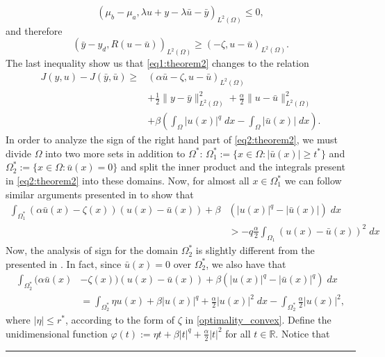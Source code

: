 \documentclass[11pt,a4paper]{amsart}
\newcommand{\kw}{\rule{2mm}{2mm}}
\newcommand{\om}{\Omega}
\renewenvironment{proof}{{Proof.}}{\hfill\kw}
\newcommand{\norm}[1]{\lVert #1 \rVert}
\begin{document}
\begin{proof}
  \[
  (\mu_b-\mu_a,\lambda u+y-\lambda \bar{u}-\bar{y})_{L^2(\om)}\le 0,
  \]
  and therefore
  \[
  (\bar{y}-y_d, R(u-\bar{u}))_{L^2(\Omega)}\ge (-\zeta,u-\bar{u})_{L^2(\om)}.
  \]
  The last inequality show us that \eqref{eq1:theorem2} changes to the relation
  \begin{equation}\label{eq2:theorem2}
     \begin{split}
        J(y,u)-J(\bar{y},\bar{u})\ge&(\alpha\bar{u}-\zeta,u-\bar{u})_{L^2(\Omega)}\\
        &+\frac{1}{2}\norm{y-\bar{y}}_{L^2(\om)}^2+\frac{\alpha}{2}\norm{u-\bar{u}}_{L^2(\om)}^2\\
        &+\beta\left(\int_{\Omega}|u(x)|^q\; dx-\int_{\om}|\bar{u}(x)|\; dx\right).
        \end{split}
    \end{equation}
In order to analyze the sign of the right hand part of \eqref{eq2:theorem2}, we must divide $\om$ into two more sets in addition to $\om^*$: $\om_1^*:=\{x\in \om:|\bar{u}(x)|\ge t^*\}$ and $\om^*_2:=\{x\in\om:\bar{u}(x)=0\}$ and split the inner product and the integrals present in \eqref{eq2:theorem2} into these domains. Now, for almost all $x\in \om_1^*$ we can follow similar arguments presented in \cite{merino-nejer} to show that
\begin{equation}\label{eq3:theorem2}
\begin{split}   
\int_{\om_1^*}(\alpha\bar{u}(x)-\zeta(x))(u(x)-\bar{u}(x))+\beta&\left(|u(x)|^q-|\bar{u}(x)|\right)\; dx\\
&>-q\frac{\alpha}{2}\int_{\om_1}(u(x)-\bar{u}(x))^2\; dx
    \end{split}
\end{equation}
Now, the analysis of sign for the domain $\om_2^*$ is slightly different from the presented in \cite{merino-nejer}. In fact, since $\bar{u}(x)=0$ over $\om_{2}^*$, we also have that
\begin{equation}\label{eq4:theorem2}
\begin{split}   
\int_{\om_2^*}(\alpha\bar{u}(x)&-\zeta(x))(u(x)-\bar{u}(x))+\beta\left(|u(x)|^q-|\bar{u}(x)|^q\right)\; dx\\
&=\int_{\om_2^*}\eta u(x)+\beta |u(x)|^q+\frac{\alpha}{2}|u(x)|^2\; dx-\int_{\om_2^*}\frac{\alpha}{2}|u(x)|^2,
    \end{split}
\end{equation}
where $|\eta|\le r^*$, according to the form of $\zeta$ in \eqref{optimality_convex}. Define the unidimensional function $\varphi(t):=\eta t+\beta|t|^q+\frac{\alpha}{2}|t|^2$ for all $t\in \mathbb{R}$. Notice that 

\end{proof}
\end{document}
